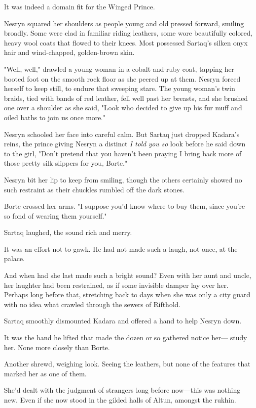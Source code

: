 It was indeed a domain fit for the Winged Prince.

Nesryn squared her shoulders as people young and old pressed forward, smiling broadly. Some were clad in familiar riding leathers, some wore beautifully colored, heavy wool coats that flowed to their knees. Most possessed Sartaq's silken onyx hair and wind-chapped, golden-brown skin.

"Well, well," drawled a young woman in a cobalt-and-ruby coat, tapping her booted foot on the smooth rock floor as she peered up at them. Nesryn forced herself to keep still, to endure that sweeping stare. The young woman's twin braids, tied with bands of red leather, fell well past her breasts, and she brushed one over a shoulder as she said, "Look who decided to give up his fur muff and oiled baths to join us once more."

Nesryn schooled her face into careful calm. But Sartaq just dropped Kadara's reins, the prince giving Nesryn a distinct \emph{I told you so}
look before he said down to the girl, "Don't pretend that you haven't been praying I bring back more of those pretty silk slippers for you, Borte."

Nesryn bit her lip to keep from smiling, though the others certainly showed no such restraint as their chuckles rumbled off the dark stones.

Borte crossed her arms. "I suppose you'd know where to buy them, since you're so fond of wearing them yourself."

Sartaq laughed, the sound rich and merry.

It was an effort not to gawk. He had not made such a laugh, not once, at the palace.

And when had she last made such a bright sound? Even with her aunt and uncle, her laughter had been restrained, as if some invisible damper lay over her. Perhaps long before that, stretching back to days when she was only a city guard with no idea what crawled through the sewers of Rifthold.

Sartaq smoothly dismounted Kadara and offered a hand to help Nesryn down.

It was the hand he lifted that made the dozen or so gathered notice her--- study her. None more closely than Borte.

Another shrewd, weighing look. Seeing the leathers, but none of the features that marked her as one of them.

She'd dealt with the judgment of strangers long before now---this was nothing new. Even if she now stood in the gilded halls of Altun, amongst the rukhin.

